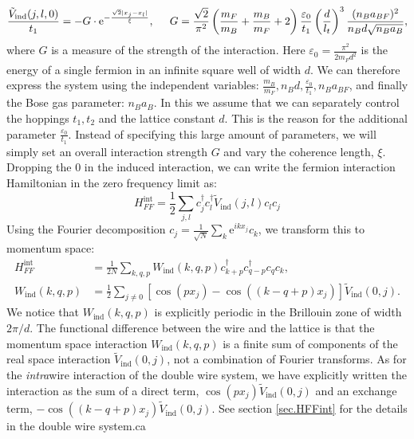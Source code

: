 \begin{equation}
\frac{\tilde{V}_{\text{ind}}(j, l, 0)}{t_1} = -G \cdot \text{e}^{-\frac{\sqrt{2}|x_j - x_l|}{\xi}}, \hspace{0.5cm} G = \frac{\sqrt{2}}{\pi^2} \left(\frac{m_F}{m_B} + \frac{m_B}{m_F} + 2\right)\frac{\varepsilon_0}{t_1}\left(\frac{d}{l_t}\right)^3 \frac{(n_Ba_{BF})^2}{n_Bd\sqrt{n_Ba_B}},
\label{eq.Inducedcinteractionrealspaceunitless.kitaevchain} 
\end{equation}
where $G$ is a measure of the strength of the interaction. Here $\varepsilon_0 = \frac{\pi^2}{2m_Fd^2}$ is the energy of a single fermion in an infinite square well of width $d$. We can therefore express the system using the independent variables: $\frac{m_B}{m_F}, n_Bd, \frac{\varepsilon_0}{t_1}, n_B a_{BF}$, and finally the Bose gas parameter: $n_B a_{B}$. In this we assume that we can separately control the hoppings $t_1, t_2$ and the lattice constant $d$. This is the reason for the additional parameter $\frac{\varepsilon_0}{t_1}$. Instead of specifying this large amount of parameters, we will simply set an overall interaction strength $G$ and vary the coherence length, $\xi$. Dropping the $0$ in the induced interaction, we can write the fermion interaction Hamiltonian in the zero frequency limit as:
\begin{equation}
H^{\text{int}}_{FF} = \frac{1}{2}\sum_{j,l} c^\dagger_j c^\dagger_l \tilde{V}_{\text{ind}}(j, l) c_l c_j
\label{eq.Hintrealspace.lattice}
\end{equation}
Using the Fourier decomposition $c_j = \frac{1}{\sqrt{N}}\sum_k \text{e}^{ikx_j}c_k$, we transform this to momentum space:
\begin{align}
H^{\text{int}}_{FF} &= \frac{1}{2N} \sum_{k, q, p} W_{\text{ind}}(k, q, p) c^\dagger_{k + p} c^\dagger_{q - p} c_q c_k, \nonumber \\  
W_{\text{ind}}(k, q, p) &= \frac{1}{2}\sum_{j\neq 0} \left[\cos(px_j) - \cos((k - q + p)x_j) \right]\tilde{V}_{\text{ind}}(0, j). 
\label{eq.Hintmomentumspace.lattice}
\end{align}
We notice that $W_{\text{ind}}(k, q, p)$ is explicitly periodic in the Brillouin zone of width $2\pi / d$. The functional difference between the wire and the lattice is that the momentum space interaction $W_{\text{ind}}(k, q, p)$ is a finite sum of components of the real space interaction $\tilde{V}_{\text{ind}}(0, j)$, not a combination of Fourier transforms. As for the \textit{intra}wire interaction of the double wire system, we have explicitly written the interaction as the sum of a direct term, $\cos(px_j)\tilde{V}_{\text{ind}}(0, j)$ and an exchange term, $ - \cos((k - q + p)x_j)\tilde{V}_{\text{ind}}(0, j)$. See section \ref{sec.HFFint} for the details in the double wire system.ca

